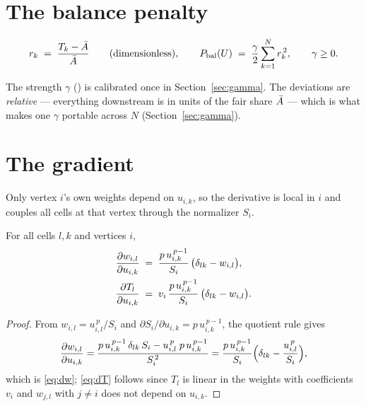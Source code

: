 \documentclass[11pt,a4paper]{article}
\begin{document}
\section{The balance penalty}
\label{sec:penalty}

\begin{defn}
\label{defn:penalty}
\begin{equation}
  r_k \;=\; \frac{T_k - \bar{A}}{\bar{A}}
  \qquad\text{(dimensionless)},
  \qquad
  P_{\mathrm{bal}}(U) \;=\; \frac{\gamma}{2}\sum_{k=1}^{N} r_k^{\,2},
  \qquad \gamma \ge 0 .
  \label{eq:penalty}
\end{equation}
\end{defn}

The strength $\gamma$ () is calibrated once in
Section~\ref{sec:gamma}. The deviations are \emph{relative} — everything
downstream is in units of the fair share $\bar{A}$ — which is what makes one
$\gamma$ portable across $N$ (Section~\ref{sec:gamma}).

\section{The gradient}
\label{sec:gradient}

Only vertex $i$'s own weights depend on $u_{i,k}$, so the derivative is local
in $i$ and couples all cells at that vertex through the normalizer $S_i$.

\begin{prop}
\label{prop:dw}
For all cells $l,k$ and vertices $i$,
\begin{align}
  \dfrac{\partial w_{i,l}}{\partial u_{i,k}}
  &\;=\; \frac{p\, u_{i,k}^{\,p-1}}{S_i}\,\bigl(\delta_{lk} - w_{i,l}\bigr),
  \label{eq:dw}\\
  \dfrac{\partial T_l}{\partial u_{i,k}}
  &\;=\; v_i\,\frac{p\, u_{i,k}^{\,p-1}}{S_i}\,\bigl(\delta_{lk} - w_{i,l}\bigr).
  \label{eq:dT}
\end{align}
\end{prop}

\begin{proof}
From $w_{i,l}=u_{i,l}^{\,p}/S_i$ and
$\partial S_i/\partial u_{i,k} = p\,u_{i,k}^{\,p-1}$, the quotient rule gives
\[
  \dfrac{\partial w_{i,l}}{\partial u_{i,k}}
  = \frac{p\,u_{i,k}^{\,p-1}\,\delta_{lk}\,S_i
        - u_{i,l}^{\,p}\; p\,u_{i,k}^{\,p-1}}{S_i^{\,2}}
  = \frac{p\,u_{i,k}^{\,p-1}}{S_i}\Bigl(\delta_{lk}
        - \frac{u_{i,l}^{\,p}}{S_i}\Bigr),
\]
which is \eqref{eq:dw}; \eqref{eq:dT} follows since $T_l$ is linear in the
weights with coefficients $v_i$ and $w_{j,l}$ with $j\neq i$ does not depend
on $u_{i,k}$.
\end{proof}
\end{document}
